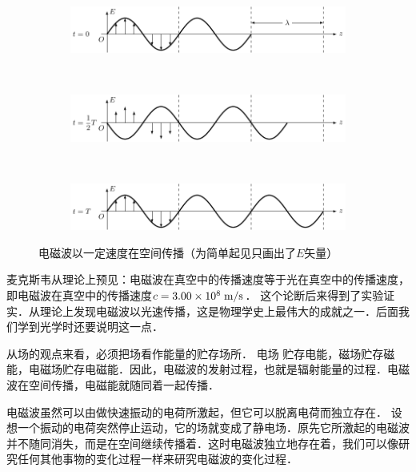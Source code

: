 \begin{figure}[htbp]
	\centering
	\begin{subfigure}{0.9\linewidth}
		\centering
		\includegraphics{fig/C/4-8a.pdf}
		\caption{}\label{fig_C_4-8a}
	\end{subfigure}
	\\
	\begin{subfigure}{0.9\linewidth}
		\centering
		\includegraphics{fig/C/4-8b.pdf}
		\caption{}\label{fig_C_4-8b}
	\end{subfigure}
	\\
	\begin{subfigure}{0.9\linewidth}
		\centering
		\includegraphics{fig/C/4-8c.pdf}
		\caption{}\label{fig_C_4-8c}
	\end{subfigure}
	\caption{电磁波以一定速度在空间传播（为简单起见只画出了$E$矢量）}\label{fig_C_4-8}
\end{figure}


麦克斯韦从理论上预见：电磁波在真空中的传播速度等于光在真空中的传播速度，即电磁波在真空中的传播速度$c=3.00\times10^8\;\text{m}/\text{s}$．
这个论断后来得到了实验证实．从理论上发现电磁波以光速传播，这是物理学史上最伟大的成就之一．后面我们学到光学时还要说明这一点．

从场的观点来看，必须把场看作能量的贮存场所．
电场
贮存电能，磁场贮存磁能，电磁场贮存电磁能．因此，电磁波的发射过程，也就是辐射能量的过程．电磁波在空间传播，电磁能就随同着一起传播．

电磁波虽然可以由做快速振动的电荷所激起，但它可以脱离电荷而独立存在．
设想一个振动的电荷突然停止运动，它的场就变成了静电场．原先它所激起的电磁波并不随同消失，而是在空间继续传播着．这时电磁波独立地存在着，我们可以像研究任何其他事物的变化过程一样来研究电磁波的变化过程．

